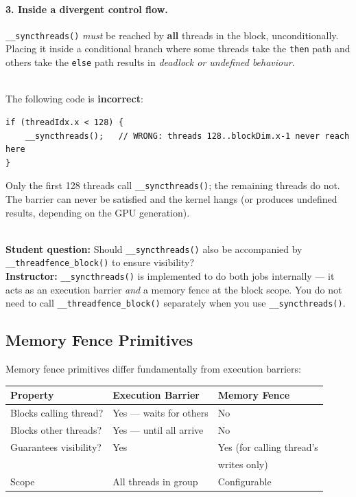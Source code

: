 \paragraph{3. Inside a divergent control flow.}
\texttt{\_\_syncthreads()} \emph{must} be reached by \textbf{all} threads in
the block, unconditionally. Placing it inside a conditional branch where some
threads take the \texttt{then} path and others take the \texttt{else} path
results in \emph{deadlock or undefined behaviour}.

\begin{pppitfall}
  \\The following code is \textbf{incorrect}:
\begin{lstlisting}[numbers=none]
if (threadIdx.x < 128) {
    __syncthreads();   // WRONG: threads 128..blockDim.x-1 never reach here
}
\end{lstlisting}
  Only the first 128 threads call \texttt{\_\_syncthreads()}; the remaining
  threads do not. The barrier can never be satisfied and the kernel hangs
  (or produces undefined results, depending on the GPU generation).
\end{pppitfall}

\begin{ppnote}
  \\\textbf{Student question:} Should \texttt{\_\_syncthreads()} also be
  accompanied by \texttt{\_\_threadfence\_block()} to ensure visibility?\\[4pt]
  \textbf{Instructor:} \texttt{\_\_syncthreads()} is implemented to do both
  jobs internally --- it acts as an execution barrier \emph{and} a memory
  fence at the block scope. You do not need to call
  \texttt{\_\_threadfence\_block()} separately when you use
  \texttt{\_\_syncthreads()}.
\end{ppnote}

\subsection{Memory Fence Primitives}
\label{subsec:threadfence}

Memory fence primitives differ fundamentally from execution barriers:

\begin{center}
\renewcommand{\arraystretch}{1.3}
\begin{tabular}{@{}lll@{}}
  \toprule
  \textbf{Property} & \textbf{Execution Barrier} & \textbf{Memory Fence} \\
  \midrule
  Blocks calling thread? & Yes --- waits for others & No \\
  Blocks other threads? & Yes --- until all arrive & No \\
  Guarantees visibility? & Yes & Yes (for calling thread's \\&&writes only) \\
  Scope & All threads in group & Configurable \\
  \bottomrule
\end{tabular}
\end{center}

